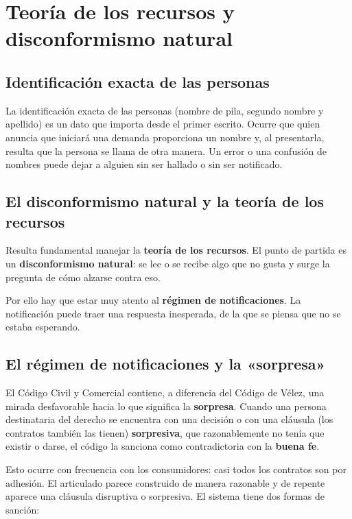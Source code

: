 \documentclass[12pt,oneside]{book}
\begin{document}
\chapter[Teoría de los recursos]{Teoría de los recursos y disconformismo natural}

\section{Identificación exacta de las personas}

La identificación exacta de las personas (nombre de pila, segundo nombre y apellido) es un dato que importa desde el primer escrito. Ocurre que quien anuncia que iniciará una demanda proporciona un nombre y, al presentarla, resulta que la persona se llama de otra manera. Un error o una confusión de nombres puede dejar a alguien sin ser hallado o sin ser notificado.

\section{El disconformismo natural y la teoría de los recursos}

Resulta fundamental manejar la \textbf{teoría de los recursos}. El punto de partida es un \textbf{disconformismo natural}: se lee o se recibe algo que no gusta y surge la pregunta de cómo alzarse contra eso.

Por ello hay que estar muy atento al \textbf{régimen de notificaciones}. La notificación puede traer una respuesta inesperada, de la que se piensa que no se estaba esperando.

\section{El régimen de notificaciones y la «sorpresa»}

El Código Civil y Comercial contiene, a diferencia del Código de Vélez, una mirada desfavorable hacia lo que significa la \textbf{sorpresa}. Cuando una persona destinataria del derecho se encuentra con una decisión o con una cláusula (los contratos también las tienen) \textbf{sorpresiva}, que razonablemente no tenía que existir o darse, el código la sanciona como contradictoria con la \textbf{buena fe}.

Esto ocurre con frecuencia con los consumidores: casi todos los contratos son por adhesión. El articulado parece construido de manera razonable y de repente aparece una cláusula disruptiva o sorpresiva. El sistema tiene dos formas de sanción:
\end{document}
